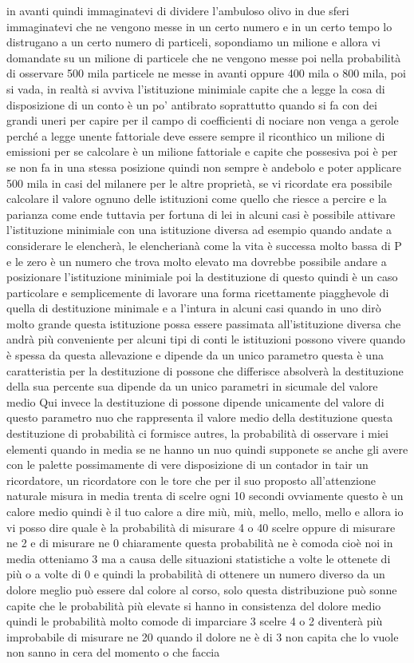 in avanti quindi immaginatevi di dividere l'ambuloso olivo in due sferi immaginatevi che ne vengono messe in un certo numero e in un certo tempo lo distrugano a un certo numero di particeli, sopondiamo un milione e allora vi domandate su un milione di particele che ne vengono messe poi nella probabilità di osservare 500 mila particele ne messe in avanti oppure 400 mila o 800 mila, poi si vada, in realtà si avviva l'istituzione minimiale capite che a legge la cosa di disposizione di un conto è un po' antibrato soprattutto quando si fa con dei grandi uneri per capire per il campo di coefficienti di nociare non venga a gerole perché a legge unente fattoriale deve essere sempre il riconthico un milione di emissioni per se calcolare è un milione fattoriale e capite che possesiva poi è per se non fa in una stessa posizione quindi non sempre è andebolo e poter applicare 500 mila in casi del milanere per le altre proprietà, se vi ricordate era possibile calcolare il valore ognuno delle istituzioni come quello che riesce a percire e la parianza come ende tuttavia per fortuna di lei in alcuni casi è possibile attivare l'istituzione minimiale con una istituzione diversa ad esempio quando andate a considerare le elencherà, le elencherianà come la vita è successa molto bassa di P e le zero è un numero che trova molto elevato ma dovrebbe possibile andare a posizionare l'istituzione minimiale poi la destituzione di questo quindi è un caso particolare e semplicemente di lavorare una forma ricettamente piagghevole di quella di destituzione minimale e a l'intura in alcuni casi quando in uno dirò molto grande questa istituzione possa essere passimata all'istituzione diversa che andrà più conveniente per alcuni tipi di conti le istituzioni possono vivere quando è spessa da questa allevazione e dipende da un unico parametro questa è una caratteristia per la destituzione di possone che differisce absolverà la destituzione della sua percente sua dipende da un unico parametri in sicumale del valore medio Qui invece la destituzione di possone dipende unicamente del valore di questo parametro nuo che rappresenta il valore medio della destituzione questa destituzione di probabilità ci formisce autres, la probabilità di osservare i miei elementi quando in media se ne hanno un nuo quindi supponete se anche gli avere con le palette possimamente di vere disposizione di un contador in tair un ricordatore, un ricordatore con le tore che per il suo proposto all'attenzione naturale misura in media trenta di scelre ogni 10 secondi ovviamente questo è un calore medio quindi è il tuo calore a dire miù, miù, mello, mello, mello e allora io vi posso dire quale è la probabilità di misurare 4 o 40 scelre oppure di misurare ne 2 e di misurare ne 0 chiaramente questa probabilità ne è comoda cioè noi in media otteniamo 3 ma a causa delle situazioni statistiche a volte le ottenete di più o a volte di 0 e quindi la probabilità di ottenere un numero diverso da un dolore meglio può essere dal colore al corso, solo questa distribuzione può sonne capite che le probabilità più elevate si hanno in consistenza del dolore medio quindi le probabilità molto comode di imparciare 3 scelre 4 o 2 diventerà più improbabile di misurare ne 20 quando il dolore ne è di 3 non capita che lo vuole non sanno in cera del momento o che faccia 